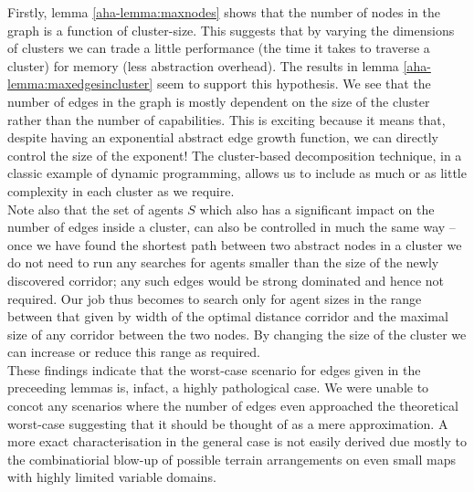 Firstly, lemma \ref{aha-lemma:maxnodes} shows that the number of nodes in the graph is a function of cluster-size. This suggests that by varying the dimensions of clusters we can trade a little performance (the time it takes to traverse a cluster) for memory (less abstraction overhead).
The results in lemma \ref{aha-lemma:maxedgesincluster} seem to support this hypothesis. We see that the number of edges in the graph is mostly dependent on the size of the cluster rather than the number of capabilities. 
This is exciting because it means that, despite having an exponential abstract edge growth function, we can directly control the size of the exponent! The cluster-based decomposition technique, in a classic example of dynamic programming, allows us to include as much or as little complexity in each cluster as we require.\\ \newline
Note also that the set of agents $S$ which also has a significant impact on the number of edges inside a cluster, can also be controlled in much the same way -- once we have found the shortest path between two abstract nodes in a cluster we do not need to run any searches for agents smaller than the size of the newly discovered corridor; any such edges would be strong dominated and hence not required. Our job thus becomes to search only for agent sizes in the range between that given by width of the optimal distance corridor and the maximal size of any corridor between the two nodes. By changing the size of the cluster we can increase or reduce this range as required.\\ 
These findings indicate that the worst-case scenario for edges given in the preceeding lemmas is, infact, a highly pathological case. We were unable to concot any scenarios where the number of edges even approached the theoretical worst-case suggesting that it should be thought of as a mere approximation. A more exact characterisation in the general case is not easily derived due mostly to the combinatiorial blow-up of possible terrain arrangements on even small maps with highly limited variable domains.

